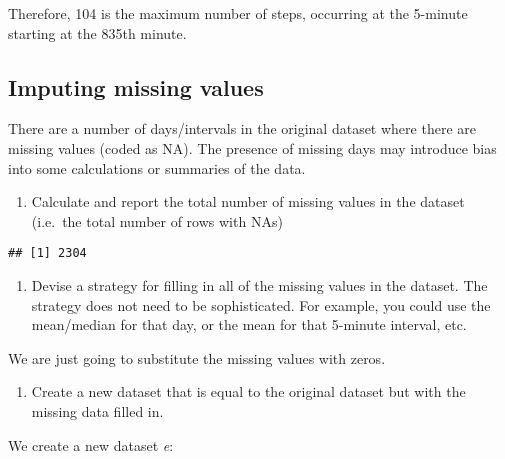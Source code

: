 \documentclass[]{article}
\newenvironment{Shaded}{\begin{snugshade}}{\end{snugshade}}
\newcommand{\KeywordTok}[1]{\textcolor[rgb]{0.13,0.29,0.53}{\textbf{{#1}}}}
\newcommand{\DecValTok}[1]{\textcolor[rgb]{0.00,0.00,0.81}{{#1}}}
\newcommand{\StringTok}[1]{\textcolor[rgb]{0.31,0.60,0.02}{{#1}}}
\newcommand{\NormalTok}[1]{{#1}}
\providecommand{\tightlist}{%
  \setlength{\itemsep}{0pt}\setlength{\parskip}{0pt}}
\begin{document}
Therefore, 104 is the maximum number of steps, occurring at the 5-minute
starting at the 835th minute.

\subsection{Imputing missing values}\label{imputing-missing-values}

There are a number of days/intervals in the original dataset where there
are missing values (coded as NA). The presence of missing days may
introduce bias into some calculations or summaries of the data.

\begin{enumerate}
\def\labelenumi{\arabic{enumi}.}
\tightlist
\item
  Calculate and report the total number of missing values in the dataset
  (i.e.~the total number of rows with NAs)
\end{enumerate}

\begin{Shaded}
\end{Shaded}

\begin{verbatim}
## [1] 2304
\end{verbatim}

\begin{enumerate}
\def\labelenumi{\arabic{enumi}.}
\setcounter{enumi}{1}
\tightlist
\item
  Devise a strategy for filling in all of the missing values in the
  dataset. The strategy does not need to be sophisticated. For example,
  you could use the mean/median for that day, or the mean for that
  5-minute interval, etc.
\end{enumerate}

We are just going to substitute the missing values with zeros.

\begin{enumerate}
\def\labelenumi{\arabic{enumi}.}
\setcounter{enumi}{2}
\tightlist
\item
  Create a new dataset that is equal to the original dataset but with
  the missing data filled in.
\end{enumerate}

We create a new dataset \emph{e}:

\begin{Shaded}
\end{Shaded}
\end{document}
